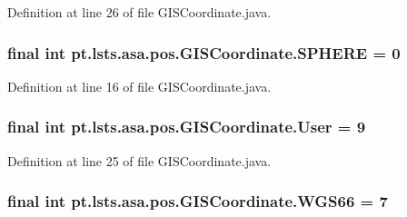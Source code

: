Definition at line 26 of file G\+I\+S\+Coordinate.\+java.

\hypertarget{classpt_1_1lsts_1_1asa_1_1pos_1_1GISCoordinate_a37209c94dad760ec7c19c97e21f9aef1}{}
\subsubsection[{S\+P\+H\+E\+R\+E}]{\setlength{\rightskip}{0pt plus 5cm}final int pt.\+lsts.\+asa.\+pos.\+G\+I\+S\+Coordinate.\+S\+P\+H\+E\+R\+E = 0\hspace{0.3cm}{\ttfamily [static]}}\label{classpt_1_1lsts_1_1asa_1_1pos_1_1GISCoordinate_a37209c94dad760ec7c19c97e21f9aef1}


Definition at line 16 of file G\+I\+S\+Coordinate.\+java.

\hypertarget{classpt_1_1lsts_1_1asa_1_1pos_1_1GISCoordinate_aff5f45f236088c4e600c706a670a18e6}{}
\subsubsection[{User}]{\setlength{\rightskip}{0pt plus 5cm}final int pt.\+lsts.\+asa.\+pos.\+G\+I\+S\+Coordinate.\+User = 9\hspace{0.3cm}{\ttfamily [static]}}\label{classpt_1_1lsts_1_1asa_1_1pos_1_1GISCoordinate_aff5f45f236088c4e600c706a670a18e6}


Definition at line 25 of file G\+I\+S\+Coordinate.\+java.

\hypertarget{classpt_1_1lsts_1_1asa_1_1pos_1_1GISCoordinate_ae3dfc45434ba52ac68c34f5b3d0f9808}{}
\subsubsection[{W\+G\+S66}]{\setlength{\rightskip}{0pt plus 5cm}final int pt.\+lsts.\+asa.\+pos.\+G\+I\+S\+Coordinate.\+W\+G\+S66 = 7\hspace{0.3cm}{\ttfamily [static]}}\label{classpt_1_1lsts_1_1asa_1_1pos_1_1GISCoordinate_ae3dfc45434ba52ac68c34f5b3d0f9808}


